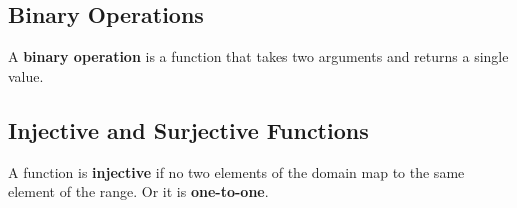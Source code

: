 \documentclass{article}
\begin{document}
\subsection*{Binary Operations}
A \textbf{binary operation} is a function that takes two arguments and returns a single value.

\subsection*{Injective and Surjective Functions}
A function is \textbf{injective} if no two elements of the domain map to the same element of the range. Or it is \textbf{one-to-one}.
\end{document}
